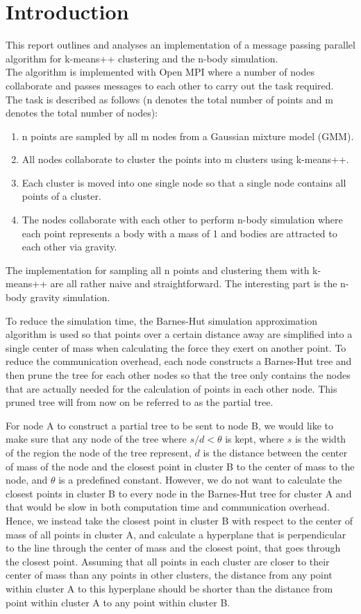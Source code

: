 \documentclass{article}
\begin{document}
\section*{Introduction}
This report outlines and analyses an implementation of a message passing parallel algorithm for
k-means++ clustering and the n-body simulation.\\
The algorithm is implemented with Open MPI where a number of nodes collaborate and passes messages
to each other to carry out the task required.\\
The task is described as follows (n denotes the total number of points and m denotes the total
number of nodes):
\begin{enumerate}
	\item n points are sampled by all m nodes from a Gaussian mixture model (GMM).
	\item All nodes collaborate to cluster the points into m clusters using k-means++.
	\item Each cluster is moved into one single node so that a single node contains all points of a
		cluster.
	\item The nodes collaborate with each other to perform n-body simulation where each point
		represents a body with a mass of 1 and bodies are attracted to each other via gravity.
\end{enumerate}

The implementation for sampling all n points and clustering them with k-means++ are all rather
naive and straightforward. The interesting part is the n-body gravity simulation.

To reduce the simulation time, the Barnes-Hut simulation approximation algorithm is used so that
points over a certain distance away are simplified into a single center of mass when calculating the
force they exert on another point. To reduce the communication overhead, each node constructs a
Barnes-Hut tree and then prune the tree for each other nodes so that the tree only contains the
nodes that are actually needed for the calculation of points in each other node. This pruned tree
will from now on be referred to as the partial tree.

For node A to construct a partial tree to be sent to node B, we would like to make sure that any
node of the tree where \(s / d < \theta\) is kept, where \(s\) is the width of the region the node of
the tree represent, \(d\) is the distance between the center of mass of the node and the closest
point in cluster B to the center of mass to the node, and \(\theta\) is a predefined constant.
However, we do not want to calculate the closest points in cluster B to every node in the Barnes-Hut
tree for cluster A and that would be slow in both computation time and communication overhead.
Hence, we instead take the closest point in cluster B with respect to the center of mass of all
points in cluster A, and calculate a hyperplane that is perpendicular to the line through the center
of mass and the closest point, that goes through the closest point. Assuming that all points in
each cluster are closer to their center of mass than any points in other clusters, the distance from
any point within cluster A to this hyperplane should be shorter than the distance from point within
cluster A to any point within cluster B.
\end{document}
